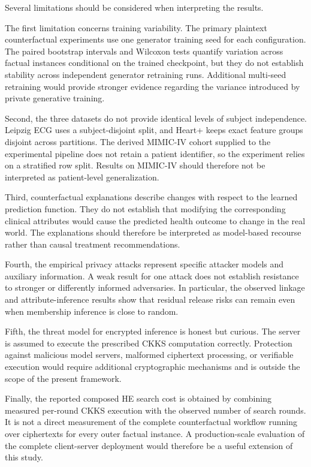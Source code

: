 \documentclass[preprint,12pt]{elsarticle}
\begin{document}
Several limitations should be considered when interpreting the results.

The first limitation concerns training variability. The primary plaintext
counterfactual experiments use one generator training seed for each
configuration. The paired bootstrap intervals and Wilcoxon tests quantify
variation across factual instances conditional on the trained checkpoint, but
they do not establish stability across independent generator retraining runs.
Additional multi-seed retraining would provide stronger evidence regarding the
variance introduced by private generative training.

Second, the three datasets do not provide identical levels of subject
independence. Leipzig ECG uses a subject-disjoint split, and Heart+ keeps exact
feature groups disjoint across partitions. The derived MIMIC-IV cohort supplied to the experimental pipeline does not
retain a patient identifier, so the experiment relies on a stratified row
split. Results on MIMIC-IV should therefore not be interpreted
as patient-level generalization.

Third, counterfactual explanations describe changes with respect to the learned
prediction function. They do not establish that modifying the corresponding
clinical attributes would cause the predicted health outcome to change in the
real world. The explanations should therefore be interpreted as model-based
recourse rather than causal treatment recommendations.

Fourth, the empirical privacy attacks represent specific attacker models and
auxiliary information. A weak result for one attack does not establish
resistance to stronger or differently informed adversaries. In particular, the
observed linkage and attribute-inference results show that residual release
risks can remain even when membership inference is close to random.

Fifth, the threat model for encrypted inference is honest but curious. The
server is assumed to execute the prescribed CKKS computation correctly.
Protection against malicious model servers, malformed ciphertext processing,
or verifiable execution would require additional cryptographic mechanisms and
is outside the scope of the present framework.

Finally, the reported composed HE search cost is obtained by combining measured
per-round CKKS execution with the observed number of search rounds. It is not a
direct measurement of the complete counterfactual workflow running over
ciphertexts for every outer factual instance. A production-scale evaluation of
the complete client-server deployment would therefore be a useful extension of
this study.
\end{document}
